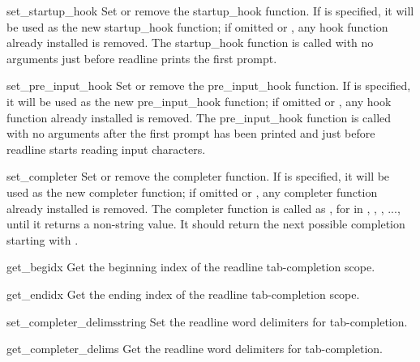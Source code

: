 \begin{funcdesc}{set_startup_hook}{}
Set or remove the startup_hook function.  If  is specified,
it will be used as the new startup_hook function; if omitted or
, any hook function already installed is removed.  The
startup_hook function is called with no arguments just
before readline prints the first prompt.
\end{funcdesc}

\begin{funcdesc}{set_pre_input_hook}{}
Set or remove the pre_input_hook function.  If  is specified,
it will be used as the new pre_input_hook function; if omitted or
, any hook function already installed is removed.  The
pre_input_hook function is called with no arguments after the first prompt
has been printed and just before readline starts reading input characters.
\end{funcdesc}

\begin{funcdesc}{set_completer}{}
Set or remove the completer function.  If  is specified,
it will be used as the new completer function; if omitted or
, any completer function already installed is removed.  The
completer function is called as , for  in , , , ...,
until it returns a non-string value.  It should return the next
possible completion starting with .
\end{funcdesc}

\begin{funcdesc}{get_begidx}{}
Get the beginning index of the readline tab-completion scope.
\end{funcdesc}

\begin{funcdesc}{get_endidx}{}
Get the ending index of the readline tab-completion scope.
\end{funcdesc}

\begin{funcdesc}{set_completer_delims}{string}
Set the readline word delimiters for tab-completion.
\end{funcdesc}

\begin{funcdesc}{get_completer_delims}{}
Get the readline word delimiters for tab-completion.
\end{funcdesc}

